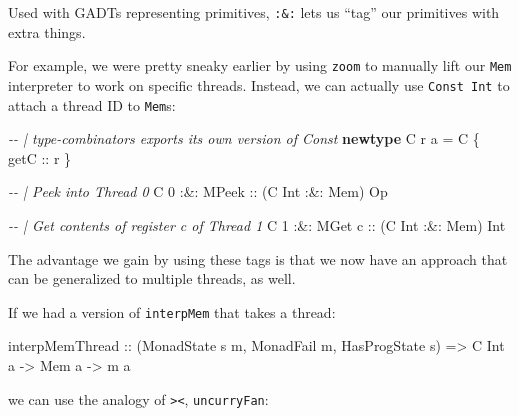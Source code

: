 \documentclass[]{article}
\newenvironment{Shaded}{}{}
\newcommand{\CharTok}[1]{\textcolor[rgb]{0.25,0.44,0.63}{#1}}
\newcommand{\CommentTok}[1]{\textcolor[rgb]{0.38,0.63,0.69}{\textit{#1}}}
\newcommand{\DataTypeTok}[1]{\textcolor[rgb]{0.56,0.13,0.00}{#1}}
\newcommand{\DecValTok}[1]{\textcolor[rgb]{0.25,0.63,0.44}{#1}}
\newcommand{\KeywordTok}[1]{\textcolor[rgb]{0.00,0.44,0.13}{\textbf{#1}}}
\newcommand{\NormalTok}[1]{#1}
\newcommand{\OperatorTok}[1]{\textcolor[rgb]{0.40,0.40,0.40}{#1}}
\newcommand{\OtherTok}[1]{\textcolor[rgb]{0.00,0.44,0.13}{#1}}
\begin{document}
Used with GADTs representing primitives, \texttt{:\&:} lets us ``tag'' our
primitives with extra things.

For example, we were pretty sneaky earlier by using \texttt{zoom} to manually
lift our \texttt{Mem} interpreter to work on specific threads. Instead, we can
actually use \texttt{Const\ Int} to attach a thread ID to \texttt{Mem}s:

\begin{Shaded}
\begin{Highlighting}[]
\CommentTok{{-}{-} | type{-}combinators exports its own version of \textquotesingle{}Const\textquotesingle{}}
\KeywordTok{newtype} \DataTypeTok{C}\NormalTok{ r a }\OtherTok{=} \DataTypeTok{C}\NormalTok{ \{}\OtherTok{ getC ::}\NormalTok{ r \}}

\CommentTok{{-}{-} | Peek into Thread 0}
\DataTypeTok{C} \DecValTok{0} \OperatorTok{:\&:} \DataTypeTok{MPeek}\OtherTok{       ::}\NormalTok{ (}\DataTypeTok{C} \DataTypeTok{Int} \OperatorTok{:\&:} \DataTypeTok{Mem}\NormalTok{) }\DataTypeTok{Op}

\CommentTok{{-}{-} | Get contents of register \textquotesingle{}c\textquotesingle{} of Thread 1}
\DataTypeTok{C} \DecValTok{1} \OperatorTok{:\&:} \DataTypeTok{MGet} \CharTok{\textquotesingle{}c\textquotesingle{}}\OtherTok{    ::}\NormalTok{ (}\DataTypeTok{C} \DataTypeTok{Int} \OperatorTok{:\&:} \DataTypeTok{Mem}\NormalTok{) }\DataTypeTok{Int}
\end{Highlighting}
\end{Shaded}

The advantage we gain by using these tags is that we now have an approach that
can be generalized to multiple threads, as well.

If we had a version of \texttt{interpMem} that takes a thread:

\begin{Shaded}
\begin{Highlighting}[]
\NormalTok{interpMemThread}
\OtherTok{    ::}\NormalTok{ (}\DataTypeTok{MonadState}\NormalTok{ s m, }\DataTypeTok{MonadFail}\NormalTok{ m, }\DataTypeTok{HasProgState}\NormalTok{ s)}
    \OtherTok{=\textgreater{}} \DataTypeTok{C} \DataTypeTok{Int}\NormalTok{ a}
    \OtherTok{{-}\textgreater{}} \DataTypeTok{Mem}\NormalTok{ a}
    \OtherTok{{-}\textgreater{}}\NormalTok{ m a}
\end{Highlighting}
\end{Shaded}

we can use the analogy of \texttt{\textgreater{}\textbar{}\textless{}},
\texttt{uncurryFan}:
\end{document}
